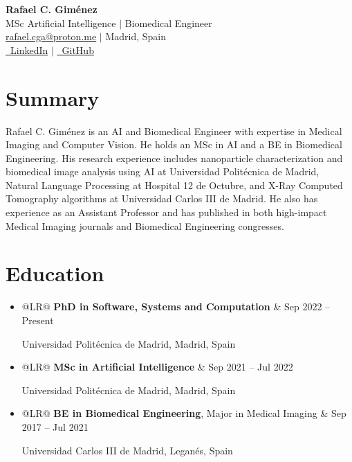 \documentclass[letterpaper,10pt]{article}
\makeatletter
\newcommand{\dateitem}[2]{
    \item
    \noindent
    \begin{tabularx}{\linewidth}{@{}LR@{}}
        #1 & #2 \\
    \end{tabularx}
    \par
}
\makeatother
\begin{document}
\begin{center}
    \vspace{-1cm} %
    \color{headerblue}
    {\Huge \bfseries Rafael C. Giménez} \\
    \vspace{3pt}
    \normalsize
    MSc Artificial Intelligence $|$ Biomedical Engineer \\
    \vspace{5pt}
    \color{textgray}
    \href{mailto:rafael.cga@proton.me}{rafael.cga@proton.me} $|$ Madrid, Spain \\
    \vspace{3pt}
    \href{https://www.linkedin.com/in/rafaelcga/}{\faLinkedin\ LinkedIn} $|$ \href{https://github.com/rafaelcga}{\faGithub\ GitHub} \\
\end{center}
\vspace{10pt} %

\section*{Summary}
\vspace{5pt}
\color{textgray}
Rafael C. Giménez is an AI and Biomedical Engineer with expertise in Medical Imaging and Computer Vision. He holds an MSc in AI and a BE in Biomedical Engineering. His research experience includes nanoparticle characterization and biomedical image analysis using AI at Universidad Politécnica de Madrid, Natural Language Processing at Hospital 12 de Octubre, and X-Ray Computed Tomography algorithms at Universidad Carlos III de Madrid. He also has experience as an Assistant Professor and has published in both high-impact Medical Imaging journals and Biomedical Engineering congresses.

\section*{Education}
\vspace{5pt}
\color{textgray}
\begin{itemize}
    \dateitem{\textbf{PhD in Software, Systems and Computation}}{Sep 2022 -- Present}
        Universidad Politécnica de Madrid, Madrid, Spain
    \dateitem{\textbf{MSc in Artificial Intelligence}}{Sep 2021 -- Jul 2022}
        Universidad Politécnica de Madrid, Madrid, Spain
    \dateitem{\textbf{BE in Biomedical Engineering}, Major in Medical Imaging}{Sep 2017 -- Jul 2021}
        Universidad Carlos III de Madrid, Leganés, Spain
\end{itemize}
\end{document}

